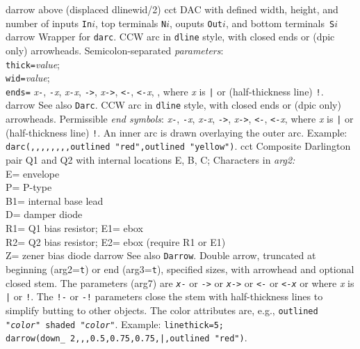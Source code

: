 %
%
  {darrow}%
  {above (displaced dlinewid/2)}%
%
  {cct}%
  {DAC with defined width, height, and number of inputs {\tt In$i$},
    top terminals {\tt N$i$}, ouputs {\tt Out$i$},
    and bottom terminals~{\tt S$i$} }%
%
  {darrow}%
  {Wrapper for {\tt darc}.
   CCW arc in {\tt dline} style, with closed ends or (dpic only) arrowheads.
  Semicolon-separated {\sl parameters}:\\
  {\tt thick=}{\sl value};\\
  {\tt wid=}{\sl value};\\
  {\tt ends=} {\sl x}{\tt -},
  {\tt -}{\sl x}, {\sl x}{\tt -}{\sl x}, {\tt ->}, {\sl x}{\tt ->},
  {\tt <-}, {\tt <-}{\sl x}, {\tt <->},
  where {\sl x} is {\tt |} or (half-thickness line) {\tt !}.}%
%
  {darrow}%
  {See also {\tt Darc}.
   CCW arc in {\tt dline} style, with closed ends or (dpic only) arrowheads.
  Permissible {\sl end symbols}:
  {\sl x}{\tt -},
  {\tt -}{\sl x}, {\sl x}{\tt -}{\sl x}, {\tt ->}, {\sl x}{\tt ->},
  {\tt <-}, {\tt <-}{\sl x}, {\tt <->}
  where {\sl x} is {\tt |} or (half-thickness line) {\tt !}.
  An inner arc is drawn overlaying the outer arc.
  Example: {\tt darc(,{,},{,},{,},{,}outlined "red",outlined "yellow")}.}%
%
  {cct}%
  {Composite Darlington pair Q1 and Q2 with internal locations E, B, C;
   Characters in {\sl arg2:}\\
   E= envelope\\
   P= P-type\\
   B1= internal base lead\\
   D= damper diode\\
   R1= Q1 bias resistor; E1= ebox\\
   R2= Q2 bias resistor; E2= ebox (require R1 or E1)\\
   Z= zener bias diode 
    }%
%
  {darrow}%
  {See also {\tt Darrow}.
   Double arrow, truncated at beginning (arg2={\tt t}) or
    end (arg3={\tt t}), specified sizes,
    with arrowhead and optional closed stem. The parameters (arg7) are
    {\tt {\sl x}-} or {\tt ->} or {\tt {\sl x}->} or {\tt <-} or
    {\tt <-{\sl x}}
    or {\tt <->} where {\sl x} is {\tt |} or {\tt !}.
    The {\tt !-} or {\tt -!} parameters close
    the stem with half-thickness lines to simplify butting to other objects.
    The color attributes are, e.g.,
    {\tt outlined "{\sl color}" shaded "{\sl color}"}.
    Example:
    {\tt linethick=5; darrow(down\_\ 2,{,},0.5,0.75,0.75,|,outlined "red")}. }%
